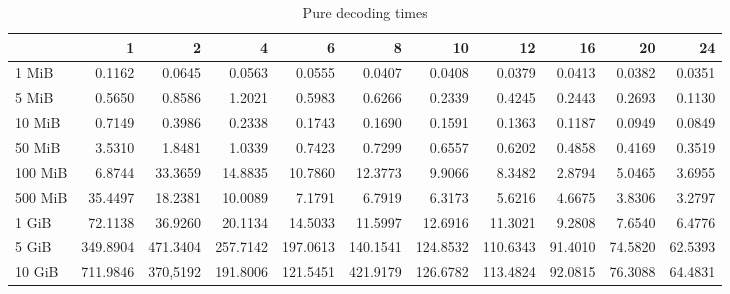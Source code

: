 \begin{table}[!h]
	\caption{Pure decoding times}
\begin{tabular}{lrrrrrrrrrr}
	\toprule
		\diagbox{File sizes }{Threads} &        1  &        2  &        4  &        6  &        8  &        10 &        12 &       16 &       20 &       24 \\
	\midrule
	1 MiB   &    0.1162 &    0.0645 &    0.0563 &    0.0555 &    0.0407 &    0.0408 &    0.0379 &   0.0413 &   0.0382 &   0.0351 \\
	5 MiB   &    0.5650 &    0.8586 &    1.2021 &    0.5983 &    0.6266 &    0.2339 &    0.4245 &   0.2443 &   0.2693 &   0.1130 \\
	10 MiB  &    0.7149 &    0.3986 &    0.2338 &    0.1743 &    0.1690 &    0.1591 &    0.1363 &   0.1187 &   0.0949 &   0.0849 \\
	50 MiB  &    3.5310 &    1.8481 &    1.0339 &    0.7423 &    0.7299 &    0.6557 &    0.6202 &   0.4858 &   0.4169 &   0.3519 \\
	100 MiB &    6.8744 &   33.3659 &   14.8835 &   10.7860 &   12.3773 &    9.9066 &    8.3482 &   2.8794 &   5.0465 &   3.6955 \\
	500 MiB &   35.4497 &   18.2381 &   10.0089 &    7.1791 &    6.7919 &    6.3173 &    5.6216 &   4.6675 &   3.8306 &   3.2797 \\
	1 GiB   &   72.1138 &   36.9260 &   20.1134 &   14.5033 &   11.5997 &   12.6916 &   11.3021 &   9.2808 &   7.6540 &   6.4776 \\
	5 GiB   &  349.8904 &  471.3404 &  257.7142 &  197.0613 &  140.1541 &  124.8532 &  110.6343 &  91.4010 &  74.5820 &  62.5393 \\
	10 GiB  &  711.9846 &  370,5192&  191.8006 &  121.5451 &  421.9179 &  126.6782 &  113.4824 &  92.0815 &  76.3088 &  64.4831 \\
	\bottomrule
\end{tabular}
\end{table}

